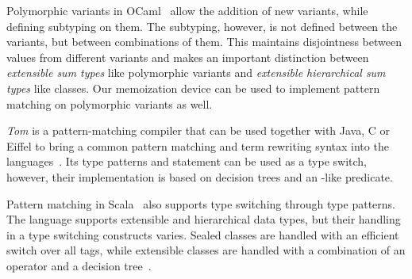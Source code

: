 Polymorphic variants in OCaml~\cite{garrigue-98} allow the addition of new 
variants, while defining subtyping on them. The subtyping, however, is not 
defined between the variants, but between combinations of them. 
This maintains disjointness between values from different variants and makes an 
important distinction between \emph{extensible sum types} like polymorphic 
variants and \emph{extensible hierarchical sum types} like classes. Our 
memoization device can be used to implement pattern matching on polymorphic 
variants as well.

\emph{Tom} is a pattern-matching compiler that can be used together with Java, C or 
Eiffel to bring a common pattern matching and term rewriting syntax into the 
languages~\cite{Moreau:2003}. Its type patterns and 
statement can be used as a type switch, however, their implementation is based 
on decision trees and an -like predicate.

Pattern matching in Scala~\cite{Scala2nd} also supports type switching through 
type patterns. The language supports extensible and hierarchical data types, but
their handling in a type switching constructs varies. Sealed classes are handled 
with an efficient switch over all tags, while extensible classes are  
handled with a combination of an  operator and a decision 
tree~\cite{EmirThesis}.